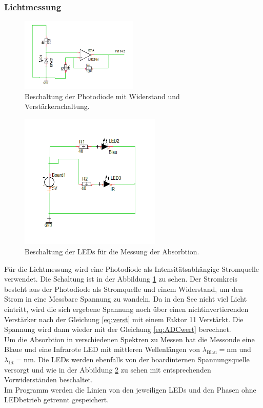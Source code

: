 \documentclass[12pt,a4paper,titlepage,headinclude,bibtotoc]{scrartcl}
\begin{document}
\subsubsection{Lichtmessung}
\begin{figure}[!h]
\centering
\includegraphics[width=0.5\textwidth]{Fotos/PhotodiodeSchaltung.png}
\caption{Beschaltung der Photodiode mit Widerstand und Verstärkerachaltung.}
\label{fig:PhotodiodeSchaltung}
\end{figure}
\begin{figure}[!h]
\centering
\includegraphics[width=0.6\textwidth]{Fotos/LEDSchaltung.png}
\caption{Beschaltung der LEDs für die Messung der Absorbtion.}
\label{fig:LEDSchaltung}
\end{figure}
Für die Lichtmessung wird eine Photodiode als Intensitätsabhängige Stromquelle verwendet.
Die Schaltung ist in der Abbildung \ref{fig:PhotodiodeSchaltung} zu sehen.
Der Stromkreis besteht aus der Photodiode als Stromquelle und einem Widerstand, um den Strom in eine Messbare Spannung zu wandeln.
Da in den See nicht viel Licht eintritt, wird die sich ergebene Spannung noch über einen nichtinvertierenden Verstärker nach der Gleichung \ref{eq:verst} mit einem Faktor 11 Verstärkt.
Die Spannung wird dann wieder mit der Gleichung \eqref{eq:ADCwert} berechnet.\\
Um die Absorbtion in verschiedenen Spektren zu Messen hat die Messonde eine Blaue und eine Infrarote LED %
mit mittleren Wellenlängen von $\lambda_\text{Blau}=\si{\nano\meter}$ und $\lambda_\text{IR}=\si{\nano\meter}$. %
Die LEDs werden ebenfalls von der boardinternen Spannungsquelle versorgt und wie in der Abbildung \ref{fig:LEDSchaltung} zu sehen mit entsprechenden Vorwiderständen beschaltet.\\
Im Programm werden die Linien von den jeweiligen LEDs und den Phasen ohne LEDbetrieb getrennt gespeichert.
\end{document}
